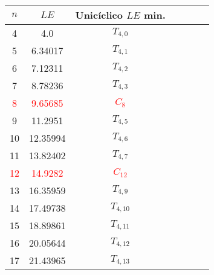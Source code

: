 \begin{tabular}{|c|c|c|c|c|c|c|}
    \hline
    $n$ & $LE$ & Unicíclico $LE$ min. \\
    \hline
    4 & 4.0 & $T_{4,0}$ \\
    \hline
    5 & 6.34017 & $T_{4,1}$ \\
    \hline
    6 & 7.12311 & $T_{4,2}$ \\
    \hline
    7 & 8.78236 & $T_{4,3}$ \\
    \hline
    \textcolor{red}{8} & \textcolor{red}{9.65685} & \textcolor{red}{$C_{8}$} \\
    \hline
    9 & 11.2951 & $T_{4,5}$ \\
    \hline
    10 & 12.35994 & $T_{4,6}$ \\
    \hline
    11 & 13.82402 & $T_{4,7}$ \\
    \hline
    \textcolor{red}{12} & \textcolor{red}{14.9282} & \textcolor{red}{$C_{12}$} \\
    \hline
    13 & 16.35959 & $T_{4,9}$ \\
    \hline
    14 & 17.49738 & $T_{4,10}$ \\
    \hline
    15 & 18.89861 & $T_{4,11}$ \\
    \hline
    16 & 20.05644 & $T_{4,12}$ \\
    \hline
    17 & 21.43965 & $T_{4,13}$ \\
    \hline
\end{tabular}